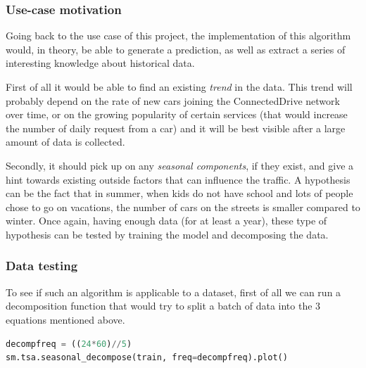 \subsubsection{Use-case motivation}
Going back to the use case of this project, the implementation of this algorithm would, in theory, be able to generate a prediction, as well as extract a series of interesting knowledge about historical data.

First of all it would be able to find an existing \textit{trend} in the data. This trend will probably depend on the rate of new cars joining  the ConnectedDrive network over time, or on the growing popularity of certain services (that would increase the number of daily request from a car) and it will be best visible after a large amount of data is collected.

Secondly, it should pick up on any \textit{seasonal components}, if they exist, and give a hint towards existing outside factors that can influence the traffic. A hypothesis can be the fact that in summer, when kids do not have school and lots of people chose to go on vacations, the number of cars on the streets is smaller compared to winter. Once again, having enough data (for at least a year), these type of hypothesis can be tested by training the model and decomposing the data.\\

\subsubsection{Data testing}

To see if such an algorithm is applicable to a dataset, first of all we can run a decomposition function that would try to split a batch of data into the 3 equations mentioned above. 

\begin{lstlisting}[language=Python, caption=Data decomposition]
decompfreq = ((24*60)//5)
sm.tsa.seasonal_decompose(train, freq=decompfreq).plot()
\end{lstlisting}

